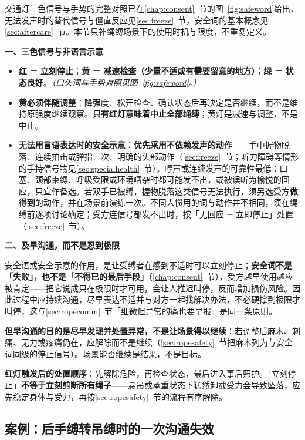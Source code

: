 \documentclass[12pt,UTF8]{ctexbook}
\begin{document}
交通灯三色信号与手势的完整对照已在\ref{chap:consent}~节的图~\ref{fig:safeword}给出，无法发声时的替代信号与僵直反应见\ref{sec:freeze}~节，安全词的基本概念见\ref{sec:aftercare}~节。本节只补绳缚场景下的使用时机与限度，不重复定义。

\noindent\textbf{一、三色信号与非语言示意}

\begin{itemize}
\item \textbf{红 = 立刻停止}；\textbf{黄 = 减速检查（少量不适或有需要留意的地方）}；\textbf{绿 = 状态良好}。\textit{（口头词与手势对照见图~\ref{fig:safeword}。）}
\item \textbf{黄必须伴随调整}：降强度、松开检查、确认状态后再决定是否继续，而不是维持原强度继续观察。\textbf{只有红灯意味着中止全部绳缚}；黄灯是减速与调整，不是中止。
\item \textbf{无法用言语表达时的安全示意}：\textbf{优先采用不依赖发声的动作}——手中握物脱落、连续拍击或弹指三次、明确的头部动作（\ref{sec:freeze}~节；听力障碍等情形的手持信号物见\ref{sec:specialhealth}~节）。哼声或连续发声的可靠性最低：口塞、颈部束缚、呼吸受限或环境嘈杂时都可能发不出，或被误听为愉悦的回应，只宜作备选。若双手已被缚，握物脱落这类信号无法执行，须另选受方\textbf{做得到}的动作，并在场景前演练一次。不同人惯用的词与动作并不相同，须在绳缚前逐项讨论确定；受方连信号都发不出时，按「无回应 = 立即停止」处置（\ref{sec:freeze}~节）。
\end{itemize}

\noindent\textbf{二、及早沟通，而不是忍到极限}

安全语或安全示意的作用，是让受缚者在感到不适时可以立刻停止；\textbf{安全词不是「失败」，也不是「不得已的最后手段」}（\ref{chap:consent}~节），受方越早使用越应被肯定——把它说成只在极限时才可用，会让人推迟叫停，反而增加损伤风险。因此过程中应持续沟通，尽早表达不适并与对方一起找解决办法，不必硬撑到极限才叫停，这与\ref{sec:ropecomm}~节「细微但异常的痛也要早报」是同一条原则。

\noindent\textbf{但早沟通的目的是尽早发现并处置异常，不是让场景得以继续}：若调整后麻木、刺痛、无力或疼痛仍在，应解除而不是继续（\ref{sec:ropesafety}~节把麻木列为与安全词同级的停止信号）。场景能否继续是结果，不是目标。

\noindent\textbf{红灯触发后的处置顺序}：先解除危险，再检查状态，最后进入事后照护。「立刻停止」\textbf{不等于立刻剪断所有绳子}——悬吊或承重状态下猛然卸载受力会导致坠落，应先稳定身体与受力，再按\ref{sec:ropesafety}~节的流程有序解除。

\subsection{案例：后手缚转吊缚时的一次沟通失效}\label{sec:ropecase}
\end{document}
